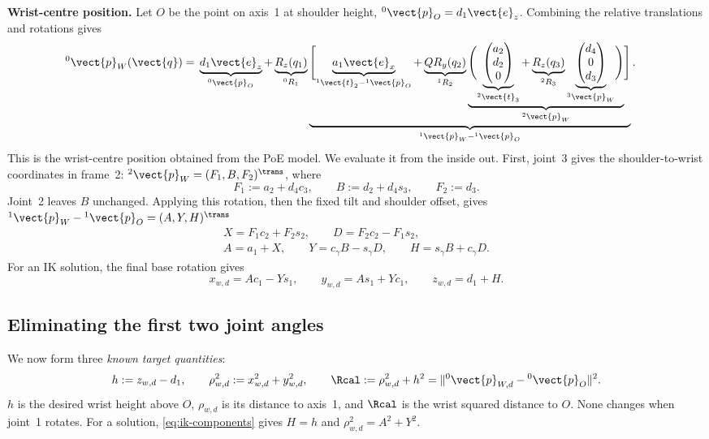 \textbf{Wrist-centre position.}
Let $O$ be the point on axis~1 at shoulder height,
${}^0\vect{p}_O=d_1\vect{e}_z$. Combining the relative translations and rotations gives
\begin{equation}
 \begin{aligned}
 {}^0\vect{p}_W(\vect{q})={}&\underbrace{d_1\vect{e}_z}_{{}^0\vect{p}_O}+\underbrace{R_z(q_1)}_{{}^0R_1}
 \underbrace{\Biggl[
   \underbrace{a_1\vect{e}_x}_{{}^1\vect{t}_2-{}^1\vect{p}_O}
   +\underbrace{Q R_y(q_2)}_{{}^1R_2}
   \underbrace{\Biggl(
     \underbrace{\begin{pmatrix}a_2\\d_2\\0\end{pmatrix}}_{{}^2\vect{t}_3}
     +\underbrace{R_z(q_3)}_{{}^2R_3}
      \underbrace{\begin{pmatrix}d_4\\0\\d_3\end{pmatrix}}_{{}^3\vect{p}_W}
   \Biggr)}_{{}^2\vect{p}_W}
 \Biggr]}_{{}^1\vect{p}_W-{}^1\vect{p}_O}.
 \end{aligned}
 \label{eq:ik-position-map}
\end{equation}
This is the wrist-centre position obtained from the PoE model.
We evaluate it from the inside out. First, joint~3 gives the shoulder-to-wrist coordinates
in frame~2: ${}^2\vect{p}_W=(F_1,B,F_2)^\trans$, where
\begin{equation}
 F_1:=a_2+d_4c_3,\qquad B:=d_2+d_4s_3,\qquad F_2:=d_3.
 \label{eq:ik-auxiliary}
\end{equation}
Joint~2 leaves $B$ unchanged. Applying this rotation, then the fixed tilt
and shoulder offset, gives ${}^1\vect{p}_W-{}^1\vect{p}_O=(A,Y,H)^\trans$
\begin{equation}
 \begin{gathered}
 X=F_1c_2+F_2s_2,\qquad D=F_2c_2-F_1s_2,\\
 A=a_1+X,\qquad Y=c_\gamma B-s_\gamma D,\qquad H=s_\gamma B+c_\gamma D.
 \end{gathered}
 \label{eq:ik-intermediate-vectors}
\end{equation}
For an IK solution, the final base rotation gives
\begin{equation}
 x_{w,d}=Ac_1-Ys_1,\qquad y_{w,d}=As_1+Yc_1,\qquad z_{w,d}=d_1+H.
 \label{eq:ik-components}
\end{equation}

\subsection{Eliminating the first two joint angles}
We now form three \emph{known target quantities}:
\begin{equation}
 h:=z_{w,d}-d_1,\qquad \rho_{w,d}^2:=x_{w,d}^2+y_{w,d}^2,\qquad
 \Rcal:=\rho_{w,d}^2+h^2=\|{}^0\vect{p}_{W,d}-{}^0\vect{p}_O\|^2.
 \label{eq:ik-invariants}
\end{equation}
$h$ is the desired wrist height above $O$, $\rho_{w,d}$ is its distance to axis~1, and $\Rcal$ is
the wrist squared distance to $O$. None changes when joint~1 rotates. For a solution,
\eqref{eq:ik-components} gives $H=h$ and $\rho_{w,d}^2=A^2+Y^2$.

